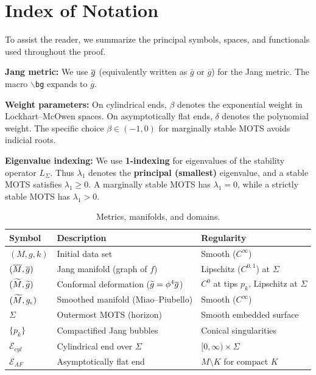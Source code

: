 \section{Index of Notation}\label{sec:Notation}

To assist the reader, we summarize the principal symbols, spaces, and functionals used throughout the proof.

\begin{remark}
\textbf{Jang metric:} We use $\overline{g}$ (equivalently written as $\bar{g}$ or $\overline{g}$) for the Jang metric. The macro $\backslash$\texttt{bg} expands to $\overline{g}$.

\textbf{Weight parameters:} On cylindrical ends, $\beta$ denotes the exponential weight in Lockhart--McOwen spaces. On asymptotically flat ends, $\delta$ denotes the polynomial weight. The specific choice $\beta \in (-1, 0)$ for marginally stable MOTS avoids indicial roots.

\textbf{Eigenvalue indexing:} We use \textbf{1-indexing} for eigenvalues of the stability operator $L_\Sigma$. Thus $\lambda_1$ denotes the \textbf{principal (smallest)} eigenvalue, and a stable MOTS satisfies $\lambda_1 \ge 0$. A marginally stable MOTS has $\lambda_1 = 0$, while a strictly stable MOTS has $\lambda_1 > 0$.
\end{remark}

\begin{table}[ht]
\centering
\caption{Metrics, manifolds, and domains.}
\begin{tabular}{l l l}
\hline
\textbf{Symbol} & \textbf{Description} & \textbf{Regularity} \\
\hline
$(M, g, k)$ & Initial data set & Smooth ($C^\infty$) \\
$(\overline{M}, \overline{g})$ & Jang manifold (graph of $f$) & Lipschitz ($C^{0,1}$) at $\Sigma$ \\
$(\widetilde{M}, \widetilde{g})$ & Conformal deformation ($\widetilde{g} = \phi^4 \overline{g}$) & $C^0$ at tips $p_k$, Lipschitz at $\Sigma$ \\
$(\widetilde{M}, g_{\epsilon})$ & Smoothed manifold (Miao--Piubello) & Smooth ($C^\infty$) \\
$\Sigma$ & Outermost MOTS (horizon) & Smooth embedded surface \\
$\{p_k\}$ & Compactified Jang bubbles & Conical singularities \\
$\mathcal{E}_{cyl}$ & Cylindrical end over $\Sigma$ & $[0,\infty) \times \Sigma$ \\
$\mathcal{E}_{AF}$ & Asymptotically flat end & $M \setminus K$ for compact $K$ \\
\hline
\end{tabular}
\end{table}

